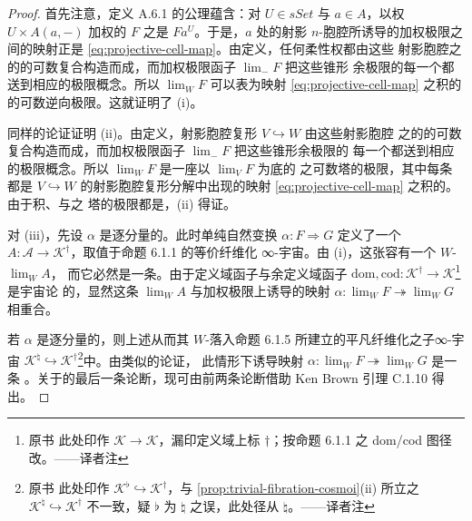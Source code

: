 \begin{proof}
首先注意，定义 A.6.1 的公理蕴含：对 $U\in sSet$ 与 $a\in A$，以权
$U\times A(a,-)$ 加权的\trDiagram{} $F$ 之\trLimit{}是\trCotensor{}
$Fa^{U}$。于是，$a$ 处的射影 $n$-胞腔所诱导的加权极限之间的映射正是%
\trIsofibration{} \eqref{eq:projective-cell-map}。由定义，任何柔性权都由这些
射影胞腔之\trCoproduct{}的\trPushout{}的可数复合构造而成，而加权极限函子 $\lim_{-}F$ 把这些锥形
余极限的每一个都送到相应的极限概念。所以 $\lim_{W}F$ 可以表为映射
\eqref{eq:projective-cell-map} 之积的\trPullback{}的可数逆向极限。这就证明了 (i)。

同样的论证证明 (ii)。由定义，射影胞腔复形 $V\hookrightarrow W$ 由这些射影胞腔
之\trCoproduct{}的\trPushout{}的可数复合构造而成，而加权极限函子 $\lim_{-}F$ 把这些锥形余极限的
每一个都送到相应的极限概念。所以 $\lim_{W}F$ 是一座以 $\lim_{V}F$ 为底的%
\trIsofibration{}之可数塔的极限，其中每条\trIsofibration{}都是
$V\hookrightarrow W$ 的射影胞腔复形分解中出现的映射
\eqref{eq:projective-cell-map} 之积的\trPullback{}。由于积、\trPullback{}与\trIsofibration{}之
塔的极限都是\trIsofibration，(ii) 得证。

对 (iii)，先设 $\alpha$ 是逐分量的\trIsofibration。此时单纯自然变换
$\alpha\colon F\Rightarrow G$ 定义了一个\trSimplicialFunctor{}
$A\colon\mathcal{A}\to\mathcal{K}^{\dagger}$，取值于命题 6.1.1 的等价纤维化%
∞-宇宙。由 (i)，这张\trDiagram{}容有一个 $W$-\trWeightedLimit{} $\lim_{W}A$，
而它必然是一条\trIsofibration。由于定义域函子与余定义域函子
$\mathrm{dom},\mathrm{cod}\colon\mathcal{K}^{\dagger}\to\mathcal{K}$\footnote{原书
此处印作 $\mathcal{K}\to\mathcal{K}$，漏印定义域上标 $\dagger$；按命题 6.1.1
之 dom/cod 图径改。——译者注}是宇宙论
的，显然这条\trIsofibration{} $\lim_{W}A$ 与加权极限上诱导的映射
$\alpha\colon\lim_{W}F\twoheadrightarrow\lim_{W}G$ 相重合。

若 $\alpha$ 是逐分量的\trTrivialFibration，则上述\trDiagram{}从而其
$W$-\trWeightedLimit{}落入命题 6.1.5 所建立的平凡纤维化之子∞-宇宙
$\mathcal{K}^{\natural}\hookrightarrow\mathcal{K}^{\dagger}$\footnote{原书
此处印作 $\mathcal{K}^{\flat}\hookrightarrow\mathcal{K}^{\dagger}$，与
\cref{prop:trivial-fibration-cosmoi}(ii) 所立之
$\mathcal{K}^{\natural}\hookrightarrow\mathcal{K}^{\dagger}$ 不一致，疑
$\flat$ 为 $\natural$ 之误，此处径从 $\natural$。——译者注}中。由类似的论证，
此情形下诱导映射 $\alpha\colon\lim_{W}F\twoheadrightarrow\lim_{W}G$ 是一条%
\trTrivialFibration。关于\trEquivalence{}的最后一条论断，现可由前两条论断借助
Ken Brown 引理 C.1.10 得出。
\end{proof}

